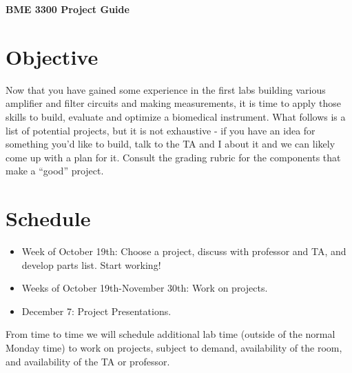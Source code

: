 \documentclass[12pt]{article}
\begin{document}
\thispagestyle{plain} %





\begin{center}

\textbf{BME 3300 Project Guide} \medskip

\end{center}

\section*{Objective} Now that you have gained some experience in the first labs building various amplifier and filter circuits and making measurements,
it is time to apply those skills to build, evaluate and optimize a biomedical instrument. 
What follows is a list of potential projects, but it is not exhaustive - if you have an idea for something you'd like to build, 
talk to the TA and I about it and we can likely come up with a plan for it. 
Consult the grading rubric for the components that make a ``good'' project. 

\section*{Schedule}
\begin{itemize}
\item Week of October 19th: Choose a project, discuss with professor and TA, and develop parts list. Start working!
\item Weeks of October 19th-November 30th: Work on projects.
\item December 7: Project Presentations.
\end{itemize}

\noindent From time to time we will schedule additional lab time (outside of the normal Monday time) to work on projects,
subject to demand, availability of the room, and availability of the TA or professor.
\end{document}
